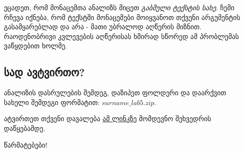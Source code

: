 \documentclass{article}\usepackage[]{graphicx}\usepackage[]{color}
\begin{document}
ეცადეთ, რომ მონაცემთა ანალიზს მიცეთ \emph{გაბმული ტექსტის სახე}. ჩემი რჩევა იქნება, რომ ტექსტში მონაცემები მოიყვანოთ თქვენი არგუმენტის გასამყარებლად და არა - მათი უბრალოდ აღწერის მიზნით. რაოდენობრივი კვლევების აღწერისას ხშირად სწორედ ამ პრობლემას ვაწყდებით ხოლმე.

\subsection*{სად ავტვირთო?}

ანალიზის დასრულების შემდეგ, დაზიპეთ ფოლდერი და დაარქვით სახელი შემდეგი ფორმატით: $surname\_lab5.zip$.

ატვირთეთ თქვენი დავალება \href{https://www.dropbox.com/request/eJJtucX9TouklqWIWrat}{ამ ლინკზე} მომდევნო შეხვედრის დაწყებამდე.


წარმატებები!
\end{document}
